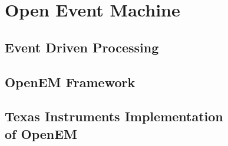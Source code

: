 \chapter{Open Event Machine}
\label{chapter:openem}


\section{Event Driven Processing}
\label{sec:event-processing}


\section{OpenEM Framework}
\label{sec:emframework}


\section[Texas Instruments Implementation of OpenEM]{Texas Instruments Implementation\\of OpenEM}
\label{sec:tiopenem}

